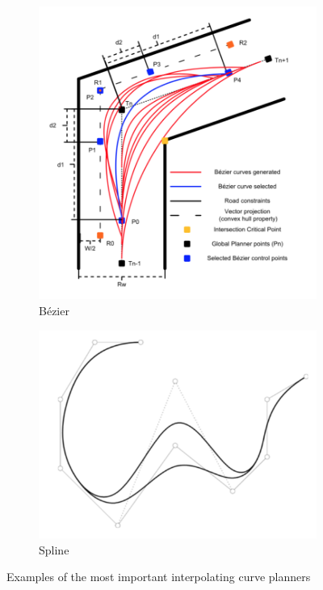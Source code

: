 \begin{figure}[h!]
\begin{subfigure}[b]{0.28\linewidth}
    \includegraphics[width=\linewidth]{images/c_bezier.png}
     \caption{Bézier \cite{gonzalez2016review}}
  \end{subfigure}
  \hspace{1cm}
  \begin{subfigure}[b]{0.33\linewidth}
    \includegraphics[width=\linewidth]{images/c_splines.png}
     \caption{Spline \cite{gonzalez2016review}}
  \end{subfigure}
  \caption{Examples of the most important interpolating curve planners}
  \label{fig:c_all_curve_planners}
\end{figure}